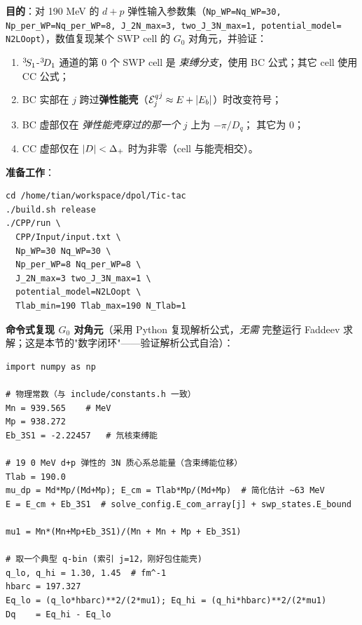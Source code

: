 \begin{numericalbox}[label=box:ch10-numerical-closure]
\textbf{目的}：对 190 MeV 的 \(d+p\) 弹性输入参数集（\texttt{Np\_WP=Nq\_WP=30,
Np\_per\_WP=Nq\_per\_WP=8, J\_2N\_max=3, two\_J\_3N\_max=1, potential\_model=
N2LOopt}），数值复现某个 SWP cell 的 \(G_0\) 对角元，并验证：

\begin{enumerate}
  \item \({}^{3}\!S_{1}\)-\({}^{3}\!D_{1}\) 通道的第 0 个 SWP cell 是
        \emph{束缚分支}，使用 BC 公式；其它 cell 使用 CC 公式；
  \item BC 实部在 \(j\) 跨过\textbf{弹性能壳}（\({\mathcal{E}_{j}^{q}}^{j} \approx
        E + |E_b|\)）时改变符号；
  \item BC 虚部仅在 \emph{弹性能壳穿过的那一个} \(j\) 上为 \(-\pi/D_q\)；
        其它为 0；
  \item CC 虚部仅在 \(|D| < \Delta_{+}\) 时为非零（cell 与能壳相交）。
\end{enumerate}

\textbf{准备工作}：

\begin{lstlisting}[style=config, caption={Tlab=190 MeV 复现命令（运行需 \(\sim 3\) 分钟，输出位于 \texttt{output/deuteron\_proton\_Ay/}）。}]
cd /home/tian/workspace/dpol/Tic-tac
./build.sh release
./CPP/run \
  CPP/Input/input.txt \
  Np_WP=30 Nq_WP=30 \
  Np_per_WP=8 Nq_per_WP=8 \
  J_2N_max=3 two_J_3N_max=1 \
  potential_model=N2LOopt \
  Tlab_min=190 Tlab_max=190 N_Tlab=1
\end{lstlisting}

\textbf{命令式复现 \(G_0\) 对角元}（采用 Python 复现解析公式，\emph{无需}
完整运行 Faddeev 求解；这是本节的"数字闭环"——验证解析公式自洽）：

\begin{lstlisting}[style=python, caption={\texttt{tools/ch10\_resolvent\_demo.py}（建议放在 \texttt{tools/} 目录里；本闭环只需 30 行 NumPy）。}]
import numpy as np

# 物理常数（与 include/constants.h 一致）
Mn = 939.565    # MeV
Mp = 938.272
Eb_3S1 = -2.22457   # 氘核束缚能

# 19 0 MeV d+p 弹性的 3N 质心系总能量（含束缚能位移）
Tlab = 190.0
mu_dp = Md*Mp/(Md+Mp); E_cm = Tlab*Mp/(Md+Mp)  # 简化估计 ~63 MeV
E = E_cm + Eb_3S1  # solve_config.E_com_array[j] + swp_states.E_bound

mu1 = Mn*(Mn+Mp+Eb_3S1)/(Mn + Mn + Mp + Eb_3S1)

# 取一个典型 q-bin (索引 j=12，刚好包住能壳)
q_lo, q_hi = 1.30, 1.45  # fm^-1
hbarc = 197.327
Eq_lo = (q_lo*hbarc)**2/(2*mu1); Eq_hi = (q_hi*hbarc)**2/(2*mu1)
Dq    = Eq_hi - Eq_lo


\end{lstlisting}
\end{numericalbox}
